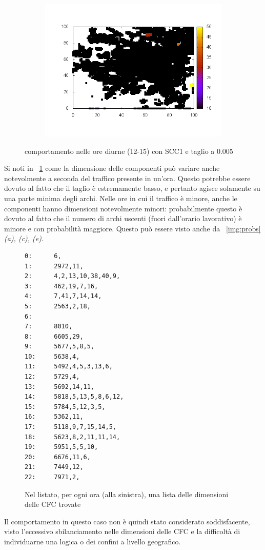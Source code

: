 \documentclass[10pt,a4paper]{article}
\begin{document}
\begin{figure}
\begin{subfigure}[b]{1\textwidth}
\includegraphics[scale=.5]{./img/stampe/scc1/15.png}
\end{subfigure}
\caption{comportamento nelle ore diurne (12-15) con SCC1 e taglio a 0.005}
\end{figure}
Si noti in ~\ref{list:scc1_0-005} come la dimensione delle componenti può variare anche notevolmente a seconda del traffico presente in un'ora. Questo potrebbe essere dovuto al fatto che il taglio è estremamente basso, e pertanto agisce solamente su una parte minima degli archi. Nelle ore in cui il traffico è minore, anche le componenti hanno dimensioni notevolmente minori: probabilmente questo è dovuto al fatto che il numero di archi uscenti (fuori dall'orario lavorativo) è minore e con probabilità maggiore. Questo può essere visto anche da ~\ref{img:probs}\emph{(a), (c), (e)}.
\begin{figure}
\begin{verbatim}
0:      6,
1:      2972,11,
2:      4,2,13,10,38,40,9,
3:      462,19,7,16,
4:      7,41,7,14,14,
5:      2563,2,18,
6:
7:      8010,
8:      6605,29,
9:      5677,5,8,5,
10:     5638,4,
11:     5492,4,5,3,13,6,
12:     5729,4,
13:     5692,14,11,
14:     5818,5,13,5,8,6,12,
15:     5784,5,12,3,5,
16:     5362,11,
17:     5118,9,7,15,14,5,
18:     5623,8,2,11,11,14,
19:     5951,5,5,10,
20:     6676,11,6,
21:     7449,12,
22:     7971,2,
\end{verbatim}
\caption{Nel listato, per ogni ora (alla sinistra), una lista delle dimensioni delle CFC trovate}
\label{list:scc1_0-005}
\end{figure}
Il comportamento in questo caso non è quindi stato considerato soddisfacente, visto l'eccessivo sbilanciamento nelle dimensioni delle CFC e la difficoltà di individuarne una logica o dei confini a livello geografico.
\end{document}
